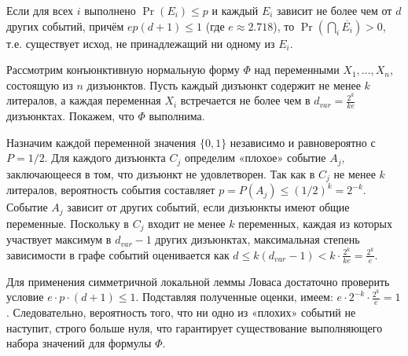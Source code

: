 \documentclass[10pt]{article}
\begin{document}
\begin{theorem}
Если для всех $i$ выполнено $\Pr(E_i) \le p$ и каждый $E_i$ зависит не более чем от $d$ других событий, причём $ep(d+1) \le 1$ (где $e \approx 2.718$), то $\Pr(\bigcap_i \overline{E_i}) > 0$, т.е. существует исход, не принадлежащий ни одному из $E_i$.
\end{theorem}

\begin{example}[SAT]
Рассмотрим конъюнктивную нормальную форму $\Phi$ над переменными $X_1, \dots, X_n$, состоящую из $n$ дизъюнктов. Пусть каждый дизъюнкт содержит не менее $k$ литералов, а каждая переменная $X_i$ встречается не более чем в $d_{var} = \frac{2^k}{ke}$ дизъюнктах. Покажем, что $\Phi$ выполнима.

Назначим каждой переменной значения $\{0, 1\}$ независимо и равновероятно с $P = 1/2$. Для каждого дизъюнкта $C_j$ определим «плохое» событие $A_j$, заключающееся в том, что дизъюнкт не удовлетворен. Так как в $C_j$ не менее $k$ литералов, вероятность события составляет $p = P(A_j) \le (1/2)^k = 2^{-k}$. Событие $A_j$ зависит от других событий, если дизъюнкты имеют общие переменные. Поскольку в $C_j$ входит не менее $k$ переменных, каждая из которых участвует максимум в $d_{var} - 1$ других дизъюнктах, максимальная степень зависимости в графе событий оценивается как $d \le k(d_{var} - 1) < k \cdot \frac{2^k}{ke} = \frac{2^k}{e}$.

Для применения симметричной локальной леммы Ловаса достаточно проверить условие $e \cdot p \cdot (d + 1) \le 1$. Подставляя полученные оценки, имеем: $e \cdot 2^{-k} \cdot \frac{2^k}{e} = 1$. Следовательно, вероятность того, что ни одно из «плохих» событий не наступит, строго больше нуля, что гарантирует существование выполняющего набора значений для формулы $\Phi$.
\end{example}
\end{document}
